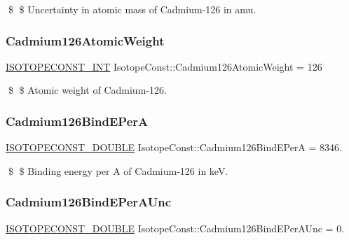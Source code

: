 \$ \$ Uncertainty in atomic mass of Cadmium-\/126 in amu. \mbox{\label{group___isotope_const-_cadmium-_cd126_gaf5d34899b303410076feec50be92367b}} 
\subsubsection{\texorpdfstring{Cadmium126\+Atomic\+Weight}{Cadmium126AtomicWeight}}
{\footnotesize\ttfamily \mbox{\hyperlink{group___isotope_const-_macros_ga5f18360b3e99483a35c32d789e62621c}{I\+S\+O\+T\+O\+P\+E\+C\+O\+N\+S\+T\+\_\+\+I\+NT}} Isotope\+Const\+::\+Cadmium126\+Atomic\+Weight = 126}

\$ \$ Atomic weight of Cadmium-\/126. \mbox{\label{group___isotope_const-_cadmium-_cd126_ga8daac1e28976652695e6e03b3beef167}} 
\subsubsection{\texorpdfstring{Cadmium126\+Bind\+E\+PerA}{Cadmium126BindEPerA}}
{\footnotesize\ttfamily \mbox{\hyperlink{group___isotope_const-_macros_ga8f45a7272ce02c0b4c65c44636ed719a}{I\+S\+O\+T\+O\+P\+E\+C\+O\+N\+S\+T\+\_\+\+D\+O\+U\+B\+LE}} Isotope\+Const\+::\+Cadmium126\+Bind\+E\+PerA = 8346.}

\$ \$ Binding energy per A of Cadmium-\/126 in keV. \mbox{\label{group___isotope_const-_cadmium-_cd126_ga8169ff14b4a02eedaf661eaec0053eda}} 
\subsubsection{\texorpdfstring{Cadmium126\+Bind\+E\+Per\+A\+Unc}{Cadmium126BindEPerAUnc}}
{\footnotesize\ttfamily \mbox{\hyperlink{group___isotope_const-_macros_ga8f45a7272ce02c0b4c65c44636ed719a}{I\+S\+O\+T\+O\+P\+E\+C\+O\+N\+S\+T\+\_\+\+D\+O\+U\+B\+LE}} Isotope\+Const\+::\+Cadmium126\+Bind\+E\+Per\+A\+Unc = 0.}

